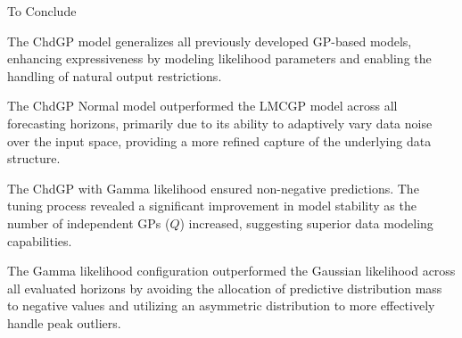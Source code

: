 \begin{frame}{To Conclude}
		
		\begin{block}{}
			The ChdGP model generalizes all previously developed GP-based models, enhancing expressiveness by modeling likelihood parameters and enabling the handling of natural output restrictions.	
		\end{block}
		
		\begin{block}{}
			The ChdGP Normal model outperformed the LMCGP model across all forecasting horizons, primarily due to its ability to adaptively vary data noise over the input space, providing a more refined capture of the underlying data structure.
		\end{block}
		
		\begin{block}{}
			The ChdGP with Gamma likelihood ensured non-negative predictions. The tuning process revealed a significant improvement in model stability as the number of independent GPs ($Q$) increased, suggesting superior data modeling capabilities.
		\end{block}
		
		\begin{block}{}
			The Gamma likelihood configuration outperformed the Gaussian likelihood across all evaluated horizons by avoiding the allocation of predictive distribution mass to negative values and utilizing an asymmetric distribution to more effectively handle peak outliers.
		\end{block}
		
\end{frame}

